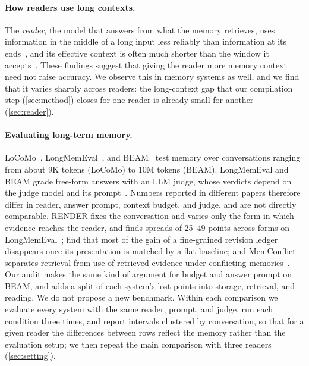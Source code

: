 \paragraph{How readers use long contexts.}
The \emph{reader}, the model that answers from what the memory retrieves, uses information in the middle of a long
input less reliably than information at its ends~\citep{liu2024lost}, and its effective context is often much shorter
than the window it accepts~\citep{hsieh2024ruler}. These findings suggest that giving the reader more memory context
need not raise accuracy. We observe this in memory systems as well, and we find that it varies sharply across
readers: the long-context gap that our compilation step (\cref{sec:method}) closes for one reader is already small
for another (\cref{sec:reader}).

\paragraph{Evaluating long-term memory.}
LoCoMo~\citep{maharana2024locomo}, LongMemEval~\citep{wu2025longmemeval}, and BEAM~\citep{tavakoli2025beam} test
memory over conversations ranging from about 9K tokens (LoCoMo) to 10M tokens (BEAM). LongMemEval and BEAM grade
free-form answers with an LLM judge, whose verdicts depend on the judge model and its prompt~\citep{zheng2023judging}.
Numbers reported in different papers therefore differ in reader, answer prompt, context budget, and judge, and are
not directly comparable. RENDER fixes the conversation and varies only the form in which evidence reaches the reader,
and finds spreads of 25--49 points across forms on LongMemEval~\citep{si2026render}; \citet{jiang2026presentation}
find that most of the gain of a fine-grained revision ledger disappears once its presentation is matched by a flat
baseline; and MemConflict separates retrieval from use of retrieved evidence under conflicting
memories~\citep{tao2026memconflict}. Our audit makes the same kind of argument for budget and answer prompt on
BEAM, and adds a split of each system's lost points into storage, retrieval, and reading. We do not propose a new benchmark. Within each comparison we evaluate every system with the
same reader, prompt, and judge, run each condition three times, and report intervals clustered by conversation, so
that for a given reader the differences between rows reflect the memory rather than the evaluation setup; we then
repeat the main comparison with three readers (\cref{sec:setting}).
